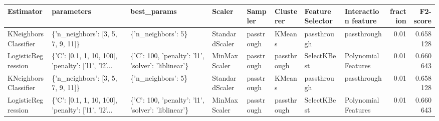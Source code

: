 \begin{tabular}{llllllllrr}
\toprule
           Estimator &                                         parameters &                                        best\_params &         Scaler &    Sampler &   Clusterer & Feature Selector & Interaction feature &  fraction &  F2-score \\
\midrule
KNeighborsClassifier &                  \{'n\_neighbors': [3, 5, 7, 9, 11]\} &                                 \{'n\_neighbors': 5\} & StandardScaler & passtrough &      KMeans &      passthrough &         passthrough &      0.01 &  0.658128 \\
  LogisticRegression & \{'C': [0.1, 1, 10, 100], 'penalty': ['l1', 'l2'... & \{'C': 100, 'penalty': 'l1', 'solver': 'liblinear'\} &   MinMaxScaler & passtrough & passthrough &      SelectKBest &  PolynomialFeatures &      0.01 &  0.660643 \\
KNeighborsClassifier &                  \{'n\_neighbors': [3, 5, 7, 9, 11]\} &                                 \{'n\_neighbors': 5\} & StandardScaler & passtrough &      KMeans &      passthrough &         passthrough &      0.01 &  0.658128 \\
  LogisticRegression & \{'C': [0.1, 1, 10, 100], 'penalty': ['l1', 'l2'... & \{'C': 100, 'penalty': 'l1', 'solver': 'liblinear'\} &   MinMaxScaler & passtrough & passthrough &      SelectKBest &  PolynomialFeatures &      0.01 &  0.660643 \\
\bottomrule
\end{tabular}
